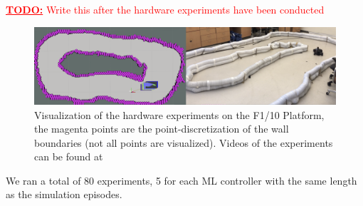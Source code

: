 \documentclass[manuscript,screen,review]{acmart}
\newcommand{\todo}[1]{\textcolor{red}{\textbf{\underline{TODO:}} #1}}
\newcommand{\ttj}[1]{\textcolor{red}{\textbf{\underline{TTJ:}} #1}}
\begin{document}

\todo{Write this after the hardware experiments have been conducted}%

\begin{figure}[ht]%
  \centering
  \includegraphics[width=\linewidth]{figures/sidebyside.png}
  \caption{Visualization of the hardware experiments on the F1/10 Platform, the magenta points are the point-discretization of the wall boundaries (not all points are visualized). Videos of the experiments can be found at}
  \label{fig:lab_setup}
\end{figure}%
We ran a total of 80 experiments, 5 for each ML controller with the same length as the simulation episodes.
\end{document}
